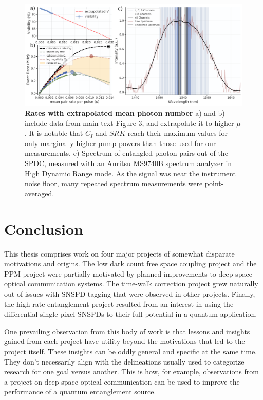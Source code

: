\documentclass[11pt]{caltech_thesis} %
\begin{document}
\hypertarget{fig:scan_extrapolate}{%
\begin{figure}
\centering
\includegraphics[width=1\textwidth,height=\textheight]{./chapter_05/figs/scan_extrapolate_light.pdf}
\caption[{Rates with extrapolated mean photon number}]{\textbf{Rates with extrapolated mean photon number} a) and b) include data from main text Figure 3, and extrapolate it to higher $\mu$. It is notable that $C_I$ and $SRK$ reach their maximum values for only marginally higher pump powers than those used for our measurements. c) Spectrum of entangled photon pairs out of the SPDC, measured with an Anritsu MS9740B spectrum analyzer in High Dynamic Range mode. As the signal was near the instrument noise floor, many repeated spectrum measurements were point-averaged.}
\label{fig:scan_extrapolate}
\end{figure}
}

\hypertarget{conclusion}{%
\chapter{Conclusion}\label{conclusion}}

This thesis comprises work on four major projects of somewhat disparate motivations and origins. The low dark count free space coupling project and the PPM project were partially motivated by planned improvements to deep space optical communication systems. The time-walk correction project grew naturally out of issues with SNSPD tagging that were observed in other projects. Finally, the high rate entanglement project resulted from an interest in using the differential single pixel SNSPDs to their full potential in a quantum application.

One prevailing observation from this body of work is that lessons and insights gained from each project have utility beyond the motivations that led to the project itself. These insights can be oddly general and specific at the same time. They don't necessarily align with the delineations usually used to categorize research for one goal versus another. This is how, for example, observations from a project on deep space optical communication can be used to improve the performance of a quantum entanglement source.
\end{document}
